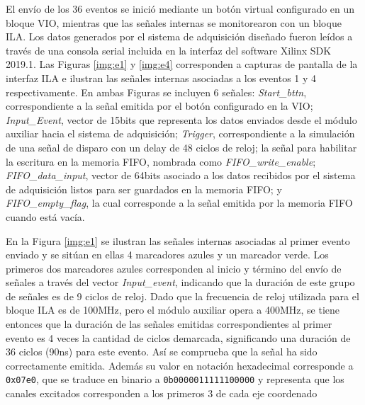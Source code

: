 	El envío de los 36 eventos se inició mediante un botón virtual configurado en un bloque VIO, mientras que las señales internas se monitorearon con un bloque ILA. Los datos generados por el sistema de adquisición diseñado fueron leídos a través de una consola serial incluida en la interfaz del software Xilinx SDK 2019.1. Las Figuras \ref{img:e1} y \ref{img:e4} corresponden a capturas de pantalla de la interfaz ILA e ilustran las señales internas asociadas a los eventos 1 y 4 respectivamente. En ambas Figuras se incluyen 6 señales: \textit{Start\_bttn}, correspondiente a la señal emitida por el botón configurado en la VIO; \textit{Input\_Event}, vector de 15bits que representa los datos enviados desde el módulo auxiliar hacia el sistema de adquisición; \textit{Trigger}, correspondiente a la simulación de una señal de disparo con un delay de 48 ciclos de reloj; la señal para habilitar la escritura en la memoria FIFO, nombrada como \textit{FIFO\_write\_enable}; \textit{FIFO\_data\_input}, vector de 64bits asociado a los datos recibidos por el sistema de adquisición listos para ser guardados en la memoria FIFO; y \textit{FIFO\_empty\_flag}, la cual corresponde a la señal emitida por la memoria FIFO cuando está vacía.
	
	En la Figura \ref{img:e1} se ilustran las señales internas asociadas al primer evento enviado y se sitúan en ellas 4 marcadores azules y un marcador verde. Los primeros dos marcadores azules corresponden al inicio y término del envío de señales a través del vector \textit{Input\_event}, indicando que la duración de este grupo de señales es de 9 ciclos de reloj. Dado que la frecuencia de reloj utilizada para el bloque ILA es de 100MHz, pero el módulo auxiliar opera a 400MHz, se tiene entonces que la duración de las señales emitidas correspondientes al primer evento es 4 veces la cantidad de ciclos demarcada, significando una duración de 36 ciclos (90ns) para este evento. Así se comprueba que la señal ha sido correctamente emitida. Además su valor en notación hexadecimal corresponde a \texttt{0x07e0}, que se traduce en binario a \texttt{0b0000011111100000} y representa que los canales excitados corresponden a los primeros 3 de cada eje coordenado   
	
